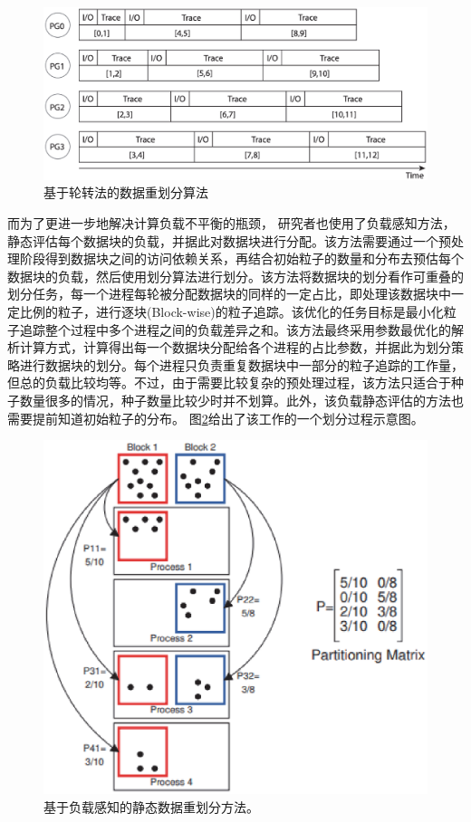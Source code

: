 \begin{figure}[!tb]
  \centering
  \includegraphics[width=\linewidth,keepaspectratio]{image/loadbalance/Round-robin.eps}
  \caption{
    基于轮转法的数据重划分算法\parencite{NouanesengsyLLSP12}
 }
\label{fig:loadbalance:round-robin}
\end{figure}

而为了更进一步地解决计算负载不平衡的瓶颈，
研究者也使用了负载感知方法\parencite{NouanesengsyLS11}，静态评估每个数据块的负载，并据此对数据块进行分配。该方法需要通过一个预处理阶段得到数据块之间的访问依赖关系，再结合初始粒子的数量和分布去预估每个数据块的负载，然后使用划分算法进行划分。该方法将数据块的划分看作可重叠的划分任务，每一个进程每轮被分配数据块的同样的一定占比，即处理该数据块中一定比例的粒子，进行逐块(Block-wise)的粒子追踪。该优化的任务目标是最小化粒子追踪整个过程中多个进程之间的负载差异之和。该方法最终采用参数最优化的解析计算方式，计算得出每一个数据块分配给各个进程的占比参数，并据此为划分策略进行数据块的划分。每个进程只负责重复数据块中一部分的粒子追踪的工作量，但总的负载比较均等。不过，由于需要比较复杂的预处理过程，该方法只适合于种子数量很多的情况，种子数量比较少时并不划算。此外，该负载静态评估的方法也需要提前知道初始粒子的分布。
图\ref{fig:loadbalance:static_partition}给出了该工作的一个划分过程示意图。

\begin{figure}[!tb]
  \centering
  \includegraphics[width=.7\linewidth,keepaspectratio]{image/loadbalance/static_partition.eps}
  \caption{
    基于负载感知的静态数据重划分方法\parencite{NouanesengsyLS11}。
 }
\label{fig:loadbalance:static_partition}
\end{figure}

